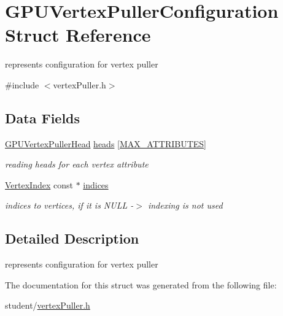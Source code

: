 \hypertarget{structGPUVertexPullerConfiguration}{}\section{G\+P\+U\+Vertex\+Puller\+Configuration Struct Reference}
\label{structGPUVertexPullerConfiguration}


represents configuration for vertex puller  




{\ttfamily \#include $<$vertex\+Puller.\+h$>$}

\subsection*{Data Fields}
\begin{DoxyCompactItemize}
\item 
\hyperlink{structGPUVertexPullerHead}{G\+P\+U\+Vertex\+Puller\+Head} \hyperlink{structGPUVertexPullerConfiguration_a10dd09c5b8d5e4e02624c204a81d63b1}{heads} \mbox{[}\hyperlink{fwd_8h_a4d992a1f9192388588184753115f6c03}{M\+A\+X\+\_\+\+A\+T\+T\+R\+I\+B\+U\+T\+ES}\mbox{]}\hypertarget{structGPUVertexPullerConfiguration_a10dd09c5b8d5e4e02624c204a81d63b1}{}\label{structGPUVertexPullerConfiguration_a10dd09c5b8d5e4e02624c204a81d63b1}

\begin{DoxyCompactList}\small\item\em reading heads for each vertex attribute \end{DoxyCompactList}\item 
\hyperlink{fwd_8h_a83b6b93a31d7fa3fc22f37a3a0798858}{Vertex\+Index} const $\ast$ \hyperlink{structGPUVertexPullerConfiguration_a1b5b4b90ce478bea0e6a905f74db4497}{indices}\hypertarget{structGPUVertexPullerConfiguration_a1b5b4b90ce478bea0e6a905f74db4497}{}\label{structGPUVertexPullerConfiguration_a1b5b4b90ce478bea0e6a905f74db4497}

\begin{DoxyCompactList}\small\item\em indices to vertices, if it is N\+U\+LL -\/$>$ indexing is not used \end{DoxyCompactList}\end{DoxyCompactItemize}


\subsection{Detailed Description}
represents configuration for vertex puller 

The documentation for this struct was generated from the following file\+:\begin{DoxyCompactItemize}
\item 
student/\hyperlink{vertexPuller_8h}{vertex\+Puller.\+h}\end{DoxyCompactItemize}
